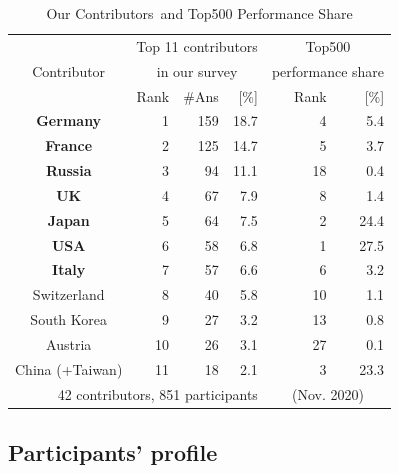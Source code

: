 \documentclass[preprint,5p,times]{elsarticle}
\def\Country{Contributor\xspace{}}%
\def\countries{contributors\xspace{}}%
\def\Countries{Contributors\xspace{}}%
\begin{document}
\begin{table}%
  \small\color{blue}%
\begin{center}%
\caption{Our \Countries\ and Top500 Performance Share}\label{tab:countries}%
\begin{tabular}{c||r|r|r||r|r}%
  \hline%
  &
  \multicolumn{3}{c||}{Top 11 \countries} &
  \multicolumn{2}{c}{Top500} \\
  \Country &
  \multicolumn{3}{c||}{in our survey} &
  \multicolumn{2}{c}{\footnotesize performance share} \\
  \cline{2-6}%
  & Rank & \#Ans & [\%] & Rank & [\%] \\
  \hline%
  \hline%
  {\bf Germany}   & 1 & 159 & 18.7 & 4  & 5.4  \\%
  {\bf France}    & 2 & 125 & 14.7 & 5  & 3.7  \\%
  {\bf Russia}    & 3 & 94  & 11.1 & 18 & 0.4  \\%
  {\bf UK}        & 4 & 67  &  7.9 & 8  & 1.4  \\%
  {\bf Japan}     & 5 & 64  &  7.5 & 2  & 24.4 \\%
  {\bf USA}       & 6 & 58  &  6.8 & 1  & 27.5 \\%
  {\bf Italy}     & 7 & 57  &  6.6 & 6  & 3.2  \\%
  Switzerland     & 8  & 40 &  5.8 & 10 & 1.1  \\%
  South Korea     & 9  & 27 &  3.2 & 13 & 0.8  \\%
  Austria         & 10 & 26 &  3.1 & 27 & 0.1  \\%
  China (+Taiwan) & 11 & 18 &  2.1 & 3  & 23.3 \\%
  \hline%
  \multicolumn{4}{r}{\footnotesize 42 \countries, 851 participants} &
  \multicolumn{2}{c}{\footnotesize (Nov. 2020)} \\%
\end{tabular}%
\end{center}%
\end{table}%

\subsection*{Participants' profile}
\end{document}
